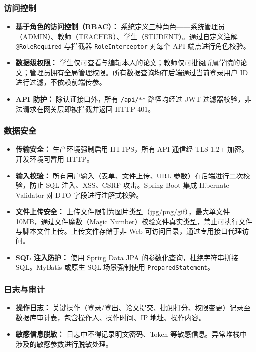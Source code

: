 \subsubsection{访问控制}

\begin{itemize}
    \item \textbf{基于角色的访问控制（RBAC）：} 系统定义三种角色——系统管理员（ADMIN）、教师（TEACHER）、学生（STUDENT）。通过自定义注解 \texttt{@RoleRequired} 与拦截器 \texttt{RoleInterceptor} 对每个 API 端点进行角色校验。
    \item \textbf{数据级权限：} 学生仅可查看与编辑本人的论文；教师仅可批阅所属学院的论文；管理员拥有全局管理权限。所有数据查询均在后端通过当前登录用户 ID 进行过滤，不依赖前端传参。
    \item \textbf{API 防护：} 除认证接口外，所有 \texttt{/api/**} 路径均经过 JWT 过滤器校验，非法请求在网关层即被拦截并返回 HTTP 401。
\end{itemize}

\subsubsection{数据安全}

\begin{itemize}
    \item \textbf{传输安全：} 生产环境强制启用 HTTPS，所有 API 通信经 TLS 1.2+ 加密。开发环境可暂用 HTTP。
    \item \textbf{输入校验：} 所有用户输入（表单、文件上传、URL 参数）在后端进行二次校验，防止 SQL 注入、XSS、CSRF 攻击。Spring Boot 集成 Hibernate Validator 对 DTO 字段进行注解式校验。
    \item \textbf{文件上传安全：} 上传文件限制为图片类型（jpg/png/gif），最大单文件 10MB，通过文件魔数（Magic Number）校验文件真实类型，禁止可执行文件与脚本文件上传。上传文件存储于非 Web 可访问目录，通过专用接口代理访问。
    \item \textbf{SQL 注入防护：} 使用 Spring Data JPA 的参数化查询，杜绝字符串拼接 SQL。MyBatis 或原生 SQL 场景强制使用 \texttt{PreparedStatement}。
\end{itemize}

\subsubsection{日志与审计}

\begin{itemize}
    \item \textbf{操作日志：} 关键操作（登录/登出、论文提交、批阅打分、权限变更）记录至数据库审计表，包含操作人、操作时间、IP 地址、操作内容。
    \item \textbf{敏感信息脱敏：} 日志中不得记录明文密码、Token 等敏感信息。异常堆栈中涉及的敏感参数进行脱敏处理。
\end{itemize}

